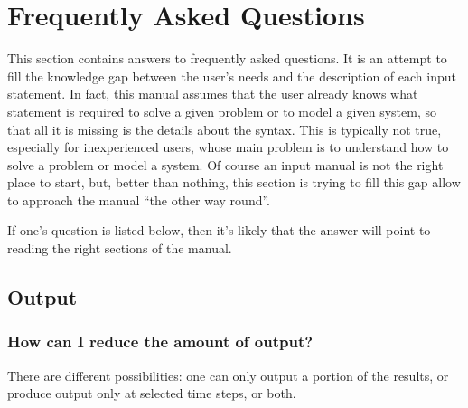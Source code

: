 %
%
%
%
%
% 
%
%

\chapter{Frequently Asked Questions}\label{sec:FAQ}
This section contains answers to frequently asked questions.
It is an attempt to fill the knowledge gap between the user's needs
and the description of each input statement.
In fact, this manual assumes that the user already knows what statement
is required to solve a given problem or to model a given system, so that
all it is missing is the details about the syntax.
This is typically not true, especially for inexperienced users, whose
main problem is to understand how to solve a problem or model a system.
Of course an input manual is not the right place to start, but, better
than nothing, this section is trying to fill this gap allow to approach
the manual ``the other way round''.

If one's question is listed below, then it's likely that the answer 
will point to reading the right sections of the manual.

\section{Output}
\subsection{How can I reduce the amount of output?}
There are different possibilities: one can only output a portion
of the results, or produce output only at selected time steps, or both.


